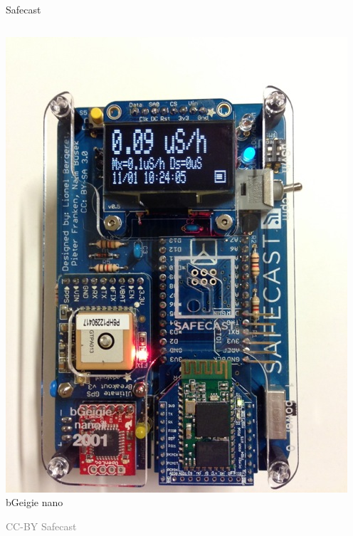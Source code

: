 \documentclass[presentation]{beamer}
\begin{document}
\begin{frame}[label=sec-7-7]{Safecast}
\vspace{-0.5cm}
\begin{columns}
\begin{column}{0.4\textwidth}
\begin{varblock}[\textwidth]{}
\includegraphics[width=\textwidth]{images/bgeigie_IMG_0009.jpeg}\\
bGeigie nano
\end{varblock}
\vspace{-0.3cm}
\tiny \textcolor{gray}{CC-BY Safecast}
\end{column}


\end{columns}
\end{frame}
\end{document}
